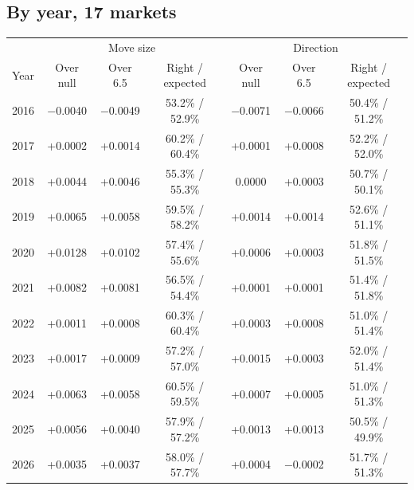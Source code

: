 \documentclass[10.5pt]{article}
\begin{document}
\subsection*{By year, 17 markets}
\begin{center}\small\begin{tabular}{@{}lccc|ccc@{}}\toprule
 & \multicolumn{3}{c|}{Move size} & \multicolumn{3}{c}{Direction}\\
Year & Over null & Over 6.5 & Right / expected & Over null & Over 6.5 & Right / expected\\\midrule
2016 & $-$0.0040 & $-$0.0049 & 53.2\% / 52.9\% & $-$0.0071 & $-$0.0066 & 50.4\% / 51.2\%\\
2017 & +0.0002 & +0.0014 & 60.2\% / 60.4\% & +0.0001 & +0.0008 & 52.2\% / 52.0\%\\
2018 & +0.0044 & +0.0046 & 55.3\% / 55.3\% & 0.0000 & +0.0003 & 50.7\% / 50.1\%\\
2019 & +0.0065 & +0.0058 & 59.5\% / 58.2\% & +0.0014 & +0.0014 & 52.6\% / 51.1\%\\
2020 & +0.0128 & +0.0102 & 57.4\% / 55.6\% & +0.0006 & +0.0003 & 51.8\% / 51.5\%\\
2021 & +0.0082 & +0.0081 & 56.5\% / 54.4\% & +0.0001 & +0.0001 & 51.4\% / 51.8\%\\
2022 & +0.0011 & +0.0008 & 60.3\% / 60.4\% & +0.0003 & +0.0008 & 51.0\% / 51.4\%\\
2023 & +0.0017 & +0.0009 & 57.2\% / 57.0\% & +0.0015 & +0.0003 & 52.0\% / 51.4\%\\
2024 & +0.0063 & +0.0058 & 60.5\% / 59.5\% & +0.0007 & +0.0005 & 51.0\% / 51.3\%\\
2025 & +0.0056 & +0.0040 & 57.9\% / 57.2\% & +0.0013 & +0.0013 & 50.5\% / 49.9\%\\
2026 & +0.0035 & +0.0037 & 58.0\% / 57.7\% & +0.0004 & $-$0.0002 & 51.7\% / 51.3\%\\
\bottomrule\end{tabular}\end{center}
\end{document}
